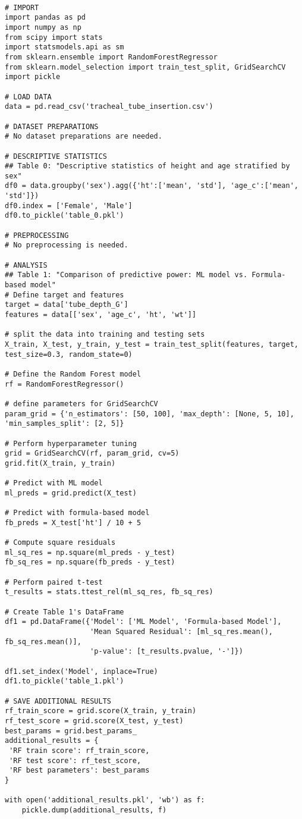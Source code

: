 \documentclass[11pt]{article}
\begin{document}
\begin{verbatim}

# IMPORT
import pandas as pd
import numpy as np
from scipy import stats
import statsmodels.api as sm
from sklearn.ensemble import RandomForestRegressor
from sklearn.model_selection import train_test_split, GridSearchCV
import pickle

# LOAD DATA
data = pd.read_csv('tracheal_tube_insertion.csv')

# DATASET PREPARATIONS
# No dataset preparations are needed.

# DESCRIPTIVE STATISTICS
## Table 0: "Descriptive statistics of height and age stratified by sex"
df0 = data.groupby('sex').agg({'ht':['mean', 'std'], 'age_c':['mean', 'std']})
df0.index = ['Female', 'Male']
df0.to_pickle('table_0.pkl')

# PREPROCESSING 
# No preprocessing is needed.

# ANALYSIS
## Table 1: "Comparison of predictive power: ML model vs. Formula-based model"
# Define target and features 
target = data['tube_depth_G']
features = data[['sex', 'age_c', 'ht', 'wt']]

# split the data into training and testing sets
X_train, X_test, y_train, y_test = train_test_split(features, target, test_size=0.3, random_state=0)

# Define the Random Forest model
rf = RandomForestRegressor()

# define parameters for GridSearchCV
param_grid = {'n_estimators': [50, 100], 'max_depth': [None, 5, 10], 'min_samples_split': [2, 5]}

# Perform hyperparameter tuning 
grid = GridSearchCV(rf, param_grid, cv=5)
grid.fit(X_train, y_train)

# Predict with ML model
ml_preds = grid.predict(X_test)

# Predict with formula-based model
fb_preds = X_test['ht'] / 10 + 5

# Compute square residuals
ml_sq_res = np.square(ml_preds - y_test)
fb_sq_res = np.square(fb_preds - y_test)

# Perform paired t-test
t_results = stats.ttest_rel(ml_sq_res, fb_sq_res)

# Create Table 1's DataFrame
df1 = pd.DataFrame({'Model': ['ML Model', 'Formula-based Model'],
                    'Mean Squared Residual': [ml_sq_res.mean(), fb_sq_res.mean()],
                    'p-value': [t_results.pvalue, '-']})

df1.set_index('Model', inplace=True)
df1.to_pickle('table_1.pkl')

# SAVE ADDITIONAL RESULTS
rf_train_score = grid.score(X_train, y_train)
rf_test_score = grid.score(X_test, y_test)
best_params = grid.best_params_
additional_results = {
 'RF train score': rf_train_score, 
 'RF test score': rf_test_score, 
 'RF best parameters': best_params
}

with open('additional_results.pkl', 'wb') as f:
    pickle.dump(additional_results, f)


\end{verbatim}
\end{document}
